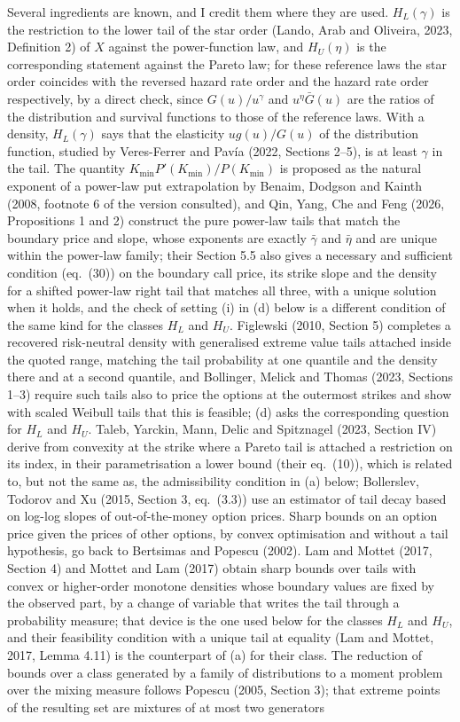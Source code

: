 \documentclass[11pt]{article}
\theoremstyle{remark}
\begin{document}
Several ingredients are known, and I credit them where they are used. $H_L(\gamma)$ is the restriction to the lower tail of the star order (Lando, Arab and Oliveira, 2023, Definition 2) of $X$ against the power-function law, and $H_U(\eta)$ is the corresponding statement against the Pareto law; for these reference laws the star order coincides with the reversed hazard rate order and the hazard rate order respectively, by a direct check, since $G(u)/u^\gamma$ and $u^\eta\bar G(u)$ are the ratios of the distribution and survival functions to those of the reference laws. With a density, $H_L(\gamma)$ says that the elasticity $ug(u)/G(u)$ of the distribution function, studied by Veres-Ferrer and Pav\'ia (2022, Sections 2--5), is at least $\gamma$ in the tail. The quantity $K_{\min}P'(K_{\min})/P(K_{\min})$ is proposed as the natural exponent of a power-law put extrapolation by Benaim, Dodgson and Kainth (2008, footnote 6 of the version consulted), and Qin, Yang, Che and Feng (2026, Propositions 1 and 2) construct the pure power-law tails that match the boundary price and slope, whose exponents are exactly $\bar\gamma$ and $\bar\eta$ and are unique within the power-law family; their Section 5.5 also gives a necessary and sufficient condition (eq.~(30)) on the boundary call price, its strike slope and the density for a shifted power-law right tail that matches all three, with a unique solution when it holds, and the check of setting (i) in (d) below is a different condition of the same kind for the classes $H_L$ and $H_U$. Figlewski (2010, Section 5) completes a recovered risk-neutral density with generalised extreme value tails attached inside the quoted range, matching the tail probability at one quantile and the density there and at a second quantile, and Bollinger, Melick and Thomas (2023, Sections 1--3) require such tails also to price the options at the outermost strikes and show with scaled Weibull tails that this is feasible; (d) asks the corresponding question for $H_L$ and $H_U$. Taleb, Yarckin, Mann, Delic and Spitznagel (2023, Section IV) derive from convexity at the strike where a Pareto tail is attached a restriction on its index, in their parametrisation a lower bound (their eq.~(10)), which is related to, but not the same as, the admissibility condition in (a) below; Bollerslev, Todorov and Xu (2015, Section 3, eq.~(3.3)) use an estimator of tail decay based on log-log slopes of out-of-the-money option prices. Sharp bounds on an option price given the prices of other options, by convex optimisation and without a tail hypothesis, go back to Bertsimas and Popescu (2002). Lam and Mottet (2017, Section 4) and Mottet and Lam (2017) obtain sharp bounds over tails with convex or higher-order monotone densities whose boundary values are fixed by the observed part, by a change of variable that writes the tail through a probability measure; that device is the one used below for the classes $H_L$ and $H_U$, and their feasibility condition with a unique tail at equality (Lam and Mottet, 2017, Lemma 4.11) is the counterpart of (a) for their class. The reduction of bounds over a class generated by a family of distributions to a moment problem over the mixing measure follows Popescu (2005, Section 3); that extreme points of the resulting set are mixtures of at most two generators 
\end{document}
